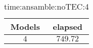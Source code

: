 \begin{table}[!ht]
	\centering
	\begin{tabular}{|c|c|}
		\hline
		Models & elapsed \\ \hline
		$4$ & $749.72$ \\ \hline
	\end{tabular}
	\caption{time:ansamble:noTEC:4}
	\label{tab:time:ansamble:noTEC:4}
\end{table}
